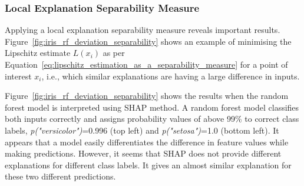 \documentclass[english]{tktltiki2}
\theoremstyle{definition}
\theoremstyle{remark}
\begin{document}




\subsubsection*{Local Explanation Separability Measure}
Applying a local explanation separability measure reveals important results. Figure~\ref{fig:iris_rf_deviation_separability} shows an example of minimising the Lipschitz estimate $L(x_i)$ as per Equation~\eqref{eq:lipschitz_estimation_as_a_separability_measure} for a point of interest $x_i$, i.e., which similar explanations are having a large difference in inputs.

Figure~\ref{fig:iris_rf_deviation_separability} shows the results when the random forest model is interpreted using SHAP method. A random forest model classifies both inputs correctly and assigns probability values of above 99\% to correct class labels, \textit{p("versicolor")}=0.996 (top left) and \textit{p("setosa")}=1.0 (bottom left). It appears that a model easily differentiates the difference in feature values while making predictions. However, it seems that SHAP does not provide different explanations for different class labels. It gives an almost similar explanation for these two different predictions. 
\end{document}
